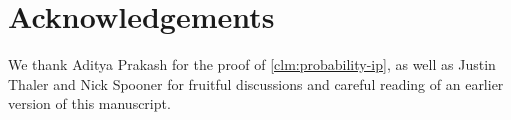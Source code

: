 \documentclass[a4paper,UKenglish,cleveref, autoref, thm-restate]{lipics-v2021}
\newtheorem{corollary}[theorem]{Corollary}
\theoremstyle{definition}
\newcommand{\field}{\mathbb{F}}
\newcommand{\poly}{\operatorname{poly}}
\newcommand{\polylog}{\operatorname{polylog}}
\newcommand{\bitset}{\{0,1\}}
\newcommand{\dimension}{m}
\newcommand{\degree}{d}
\newcommand{\fieldsize}{q}
\def\fe#1{
    \ifnum#1=1
        \alpha
    \else
    \ifnum#1=2
        \beta
    \else
    \ifnum#1=3
        \gamma
    \fi\fi\fi
}
\begin{document}
    
    

\ifblind
\else
\section*{Acknowledgements}

We thank Aditya Prakash for the proof of \cref{clm:probability-ip}, as well as Justin Thaler and Nick Spooner for fruitful discussions and careful reading of an earlier version of this manuscript. 
\fi
\end{document}
